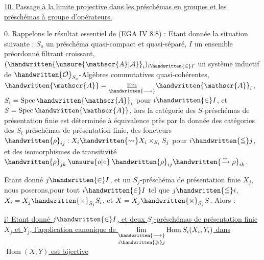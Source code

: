 
\uline{10. Passage à la limite projective dans les préschémas en groupes et les préschémas à groupe d'opérateurs.}

0. Rappelons le résultat essentiel de (EGA IV 8.8) : Etant donnée la situation suivante : $S_o$ un préschéma qu\handwritten{/}asi-compact et quasi-séparé, $I$ un ensemble préordonné filtrant croissant, $(\handwritten{\unsure{\mathscr{A}|\mathcal{A}}}_i)_{i\handwritten{\in}I}$ un système inductif de $\handwritten{\mathcal{O}}_{S_o}$-Algèbres commutatives quasi-cohérentes, $\handwritten{\mathscr{A}}=\underset{\handwritten{\longrightarrow}}{\lim}\handwritten{\mathscr{A}}_i$, $S_i=\operatorname{Spec}\handwritten{\mathscr{A}}_i$ pour $i\handwritten{\in}I$, et $S=\operatorname{Spec}\handwritten{\mathscr{A}}$, lors la catégorie des $S$-préschémas de présentation finie est déterminée à équivalence près par la donnée des catégories des $S_i$-préschémas de présentation finie, des foncteurs  $\handwritten{\rho}_{ij}:X_i\handwritten{\rightsquigarrow}X_i\times_{S_i}S_j$ \deleted{\unsure{,}} pour $i\handwritten{\leqq}j$, et des isomorphismes de transitivité $\handwritten{\rho}_{jk}\mathbin{\unsure{o|\circ}}\handwritten{\rho}_{ij}\handwritten{\xrightarrow{\sim}\rho}_{ik}$.  

Etant donné $j\handwritten{\in}I$, et un $S_j$-préschéma de présentation finie $X_j$, nous poserons,pour tout $i\handwritten{\in}I$ tel que $j\handwritten{\leqq}i$, $X_i=X_j\handwritten{\times}_{S_j}S_i$, et $X=X_j\handwritten{\times}_{S_j}S$. Alors :\handwritten{\unsure{;|:}}\margin{\handwritten{(}}

\uline{i) Etant donné $j\handwritten{\in}I$, et deux $S_j$-préschémas de présentation finie $X_j$ et $Y_j$, l'application canonique de $\underset{i\handwritten{\geqslant}j}{\underset{\handwritten{\longrightarrow}}{\lim}}\operatorname{Hom} S_i(X_i,Y_i)$ dans $\operatorname{Hom}(X,Y)$ est bijective}\margin{\handwritten{(}}

